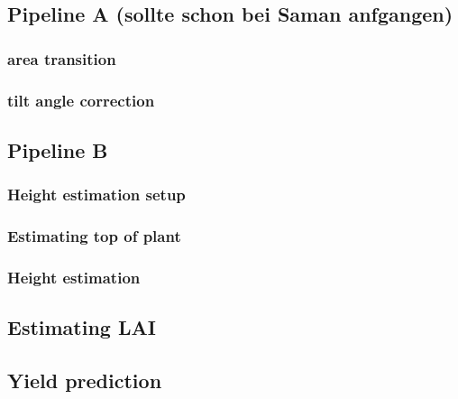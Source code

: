 \graphicspath{{members/tf/figures/}}

\subsection{Pipeline A (sollte schon bei Saman anfgangen)}

\subsubsection{area transition}
\subsubsection{tilt angle correction}
\subsection{Pipeline B}

\subsubsection{Height estimation setup}
\subsubsection{Estimating top of plant}
\subsubsection{Height estimation}
\subsection{Estimating LAI}
\subsection{Yield prediction}

